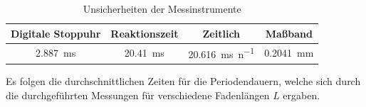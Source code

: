 \documentclass[11pt,a4paper,titlepage, ngerman]{article}
\begin{document}
		\begin{table}[ht]
			\centering
			\begin{tabular}{S|S|S||S}
				\hline
				{Digitale Stoppuhr} & {Reaktionszeit} & {Zeitlich} & {Maßband}\\
				\hline
				\SI{2,887}{\milli\second} & \SI{20,41}{\milli\second} & \SI{20,616}{\milli\second\per{n}} & \SI{0,2041}{\milli\meter} \\
				\hline
			\end{tabular}
			\caption{Unsicherheiten der Messinstrumente}
			\label{tab:unsicherheiten}
		\end{table}
			
		Es folgen die durchschnittlichen Zeiten für die Periodendauern, welche sich durch die durchgeführten Messungen für verschiedene Fadenlängen $L$ ergaben.
		\vspace{0.25cm} 
		
\end{document}
